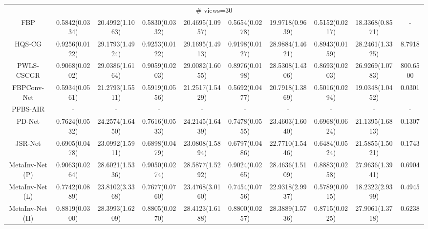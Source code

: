 \documentclass[journal,twoside]{IEEEtran}
\begin{document}
\begin{table*}[ht]
\begin{tabular}{|c|c|c|c|c|c|c|c|c|c|}
  
 \multicolumn{10}{|c|}{\cellcolor{gbygreen}\# views=30} \\
  \cline{1-10}
FBP 
&0.5842(0.0334) &20.4992(1.1063) 
&0.5830(0.0332) &20.4695(1.0957)
&0.5654(0.0278) &19.9718(0.9639)
&0.5152(0.0217) &18.3368(0.8571) &-\\
  \cline{1-10}
 HQS-CG 
&\cellcolor{gbypink}0.9256(0.0122) &\cellcolor{gbypink}29.1793(1.4924) 
&\cellcolor{gbypink}0.9253(0.0122) &\cellcolor{gbypink}29.1695(1.4913) 
&\cellcolor{gbypink}0.9198(0.0127) &\cellcolor{gbypink}28.9884(1.4621) 
&\cellcolor{gbypink}0.8943(0.0159) &\cellcolor{gbypink}28.2461(1.3325) &8.7918\\
  \cline{1-10}
PWLS-CSCGR 
&\cellcolor{gbyblue}0.9068(0.0202) &\cellcolor{gbyblue}29.0386(1.6164) 
&\cellcolor{gbyblue}0.9059(0.0203) &\cellcolor{gbyblue}29.0082(1.6055) 
&0.8976(0.0198) &\cellcolor{gbyblue}28.5308(1.4306) 
&0.8693(0.0203) &26.9269(1.0783) &800.6500\\
    \cline{1-10}
 FBPConv-Net 
&0.5934(0.0561) &21.2793(1.5511) 
&0.5919(0.0556) &21.2517(1.5429) 
&0.5692(0.0477) &20.7918(1.3869) 
&0.5016(0.0294) &19.0348(1.0452) &0.0301\\
    \cline{1-10}
 PFBS-AIR 
&- &- &- &- &- &- &- &- &-\\
    \cline{1-10}
 PD-Net 
&0.7624(0.0532) &24.2574(1.6450) 
&0.7616(0.0533) &24.2145(1.6439) 
&0.7478(0.0555) &23.4603(1.6040) 
&0.6968(0.0624) &21.1395(1.6813) &0.1307\\
  \cline{1-10}
JSR-Net 
&0.6905(0.0478) &23.0992(1.5911)
&0.6898(0.0479) &23.0808(1.5894)
&0.6797(0.0486) &22.7710(1.5446) 
&0.6484(0.0524) &21.5855(1.5021) &0.1743\\
  \cline{1-10}
  MetaInv-Net (P)
&0.9063(0.0264) &28.6021(1.5336)
&0.9050(0.0274) &28.5877(1.5292)
&\cellcolor{gbyblue}0.9024(0.0265) &28.4636(1.5109) 
&\cellcolor{gbyblue}0.8883(0.0258) &\cellcolor{gbyblue}27.9636(1.3941) &0.6904\\
  \cline{1-10}
MetaInv-Net (L) 
&0.7742(0.0889) &23.8102(3.3368) 
&0.7677(0.0760) &23.4768(3.0160) 
&0.7454(0.0756) &22.9318(2.9937) 
&0.5789(0.0915) &18.2322(2.9399) &0.4945\\
  \cline{1-10}
MetaInv-Net (H)
&0.8819(0.0300) &28.3993(1.6209) 
&0.8805(0.0270) &28.4123(1.6188) 
&0.8800(0.0257) &28.3889(1.5736) 
&0.8715(0.0225) &27.9061(1.3718) &0.6238\\
  \cline{1-10}
  

\end{tabular}
\end{table*}
\end{document}
